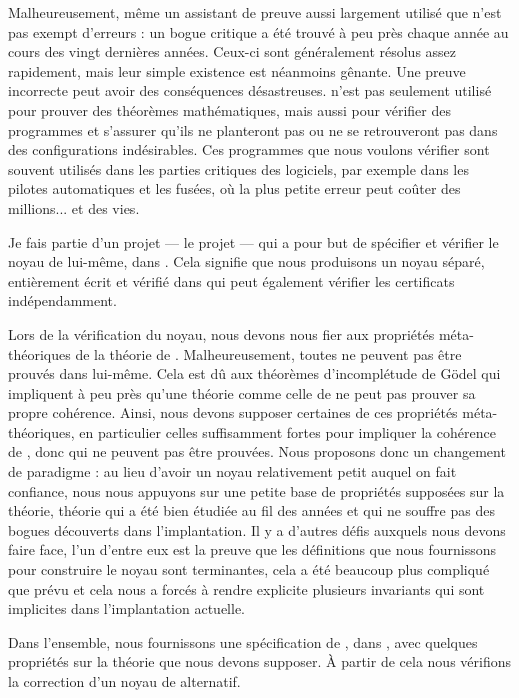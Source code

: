 Malheureusement, même un assistant de preuve aussi largement utilisé que \Coq
n'est pas exempt d'erreurs : un bogue critique a été trouvé à peu près chaque
année au cours des vingt dernières années. Ceux-ci sont généralement résolus
assez rapidement, mais leur simple existence est néanmoins gênante.
Une preuve incorrecte peut avoir des conséquences désastreuses. \Coq n'est pas
seulement utilisé pour prouver des théorèmes mathématiques, mais aussi pour
vérifier des programmes et s'assurer qu'ils ne planteront pas ou ne se
retrouveront pas dans des configurations indésirables. Ces programmes que nous
voulons vérifier sont souvent utilisés dans les parties critiques des logiciels,
par exemple dans les pilotes automatiques et les fusées, où la plus petite
erreur peut coûter des millions... et des vies.

Je fais partie d'un projet --- le projet \MetaCoq --- qui a pour but de
spécifier et vérifier le noyau de \Coq lui-même, dans \Coq. Cela signifie que
nous produisons un noyau séparé, entièrement écrit et vérifié dans \Coq qui peut
également vérifier les certificats indépendamment.

Lors de la vérification du noyau, nous devons nous fier aux propriétés
méta-théoriques de la théorie de \Coq. Malheureusement, toutes ne peuvent pas
être prouvés dans \Coq lui-même.
%
Cela est dû aux théorèmes d'incomplétude de Gödel qui impliquent à peu près
qu'une théorie comme celle de \Coq ne peut pas prouver sa propre cohérence.
Ainsi, nous devons supposer certaines de ces propriétés méta-théoriques, en
particulier celles suffisamment fortes pour impliquer la cohérence de \Coq, donc
qui ne peuvent pas être prouvées.
Nous proposons donc un changement de paradigme : au lieu d'avoir un noyau
relativement petit auquel on fait confiance, nous nous appuyons sur une petite
base de propriétés supposées sur la théorie, théorie qui a été bien étudiée au
fil des années et qui ne souffre pas des bogues découverts dans l'implantation.
Il y a d'autres défis auxquels nous devons faire face, l'un d'entre eux est la
preuve que les définitions que nous fournissons pour construire le noyau sont
terminantes, cela a été beaucoup plus compliqué que prévu et cela nous a forcés
à rendre explicite plusieurs invariants qui sont implicites dans l'implantation
actuelle.

Dans l'ensemble, nous fournissons une spécification de \Coq, dans \Coq, avec
quelques propriétés sur la théorie que nous devons supposer. À partir de cela
nous vérifions la correction d'un noyau de \Coq alternatif.

